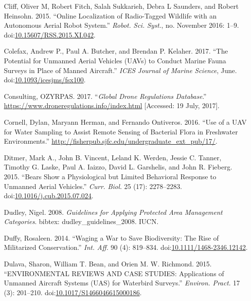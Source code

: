 \documentclass[]{interact}
\theoremstyle{plain}%
\theoremstyle{definition}
\theoremstyle{remark}
\begin{document}
\hypertarget{ref-cliff_online_2015}{}
Cliff, Oliver M, Robert Fitch, Salah Sukkarieh, Debra L Saunders, and
Robert Heinsohn. 2015. ``Online Localization of Radio-Tagged Wildlife
with an Autonomous Aerial Robot System.'' \emph{Robot. Sci. Syst.}, no.
November 2016: 1--9.
doi:\href{https://doi.org/10.15607/RSS.2015.XI.042}{10.15607/RSS.2015.XI.042}.

\hypertarget{ref-colefax_potential_2017}{}
Colefax, Andrew P., Paul A. Butcher, and Brendan P. Kelaher. 2017. ``The
Potential for Unmanned Aerial Vehicles (UAVs) to Conduct Marine Fauna
Surveys in Place of Manned Aircraft.'' \emph{ICES Journal of Marine
Science}, June.
doi:\href{https://doi.org/10.1093/icesjms/fsx100}{10.1093/icesjms/fsx100}.

\hypertarget{ref-Global2017}{}
Consulting, OZYRPAS. 2017. ``\emph{Global Drone Regulations Database}.''
\url{https://www.droneregulations.info/index.html} {[}Accessed: 19 July,
2017{]}.

\hypertarget{ref-cornell_use_2016}{}
Cornell, Dylan, Maryann Herman, and Fernando Ontiveros. 2016. ``Use of a
UAV for Water Sampling to Assist Remote Sensing of Bacterial Flora in
Freshwater Environments.''
\url{http://fisherpub.sjfc.edu/undergraduate_ext_pub/17/}.

\hypertarget{ref-ditmer_bears_2015}{}
Ditmer, Mark A., John B. Vincent, Leland K. Werden, Jessie C. Tanner,
Timothy G. Laske, Paul A. Iaizzo, David L. Garshelis, and John R.
Fieberg. 2015. ``Bears Show a Physiological but Limited Behavioral
Response to Unmanned Aerial Vehicles.'' \emph{Curr. Biol.} 25 (17):
2278--2283.
doi:\href{https://doi.org/10.1016/j.cub.2015.07.024}{10.1016/j.cub.2015.07.024}.

\hypertarget{ref-dudley_guidelines_2008}{}
Dudley, Nigel. 2008. \emph{Guidelines for Applying Protected Area
Management Categories}. bibtex: dudley\_guidelines\_2008. IUCN.

\hypertarget{ref-duffy_waging_2014}{}
Duffy, Rosaleen. 2014. ``Waging a War to Save Biodiversity: The Rise of
Militarized Conservation.'' \emph{Int. Aff.} 90 (4): 819--834.
doi:\href{https://doi.org/10.1111/1468-2346.12142}{10.1111/1468-2346.12142}.

\hypertarget{ref-dulava_environmental_2015}{}
Dulava, Sharon, William T. Bean, and Orien M. W. Richmond. 2015.
``ENVIRONMENTAL REVIEWS AND CASE STUDIES: Applications of Unmanned
Aircraft Systems (UAS) for Waterbird Surveys.'' \emph{Environ. Pract.}
17 (3): 201--210.
doi:\href{https://doi.org/10.1017/S1466046615000186}{10.1017/S1466046615000186}.
\end{document}

